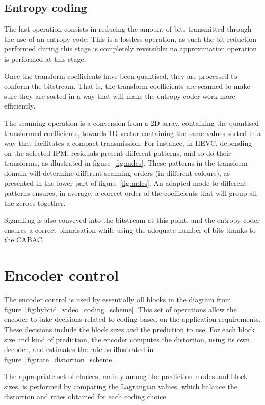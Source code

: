 \documentclass[11pt,a4paper,openright,twoside]{book}
\numberwithin{equation}{section} %
\numberwithin{figure}{section} %
\numberwithin{table}{section} %
\begin{document}
\subsection{Entropy coding}
\label{sub:entropy_coding}

The last operation consists in reducing the amount of bits transmitted through
the use of an entropy code.
This is a lossless operation, as such the bit reduction performed during this
stage is completely reversible: no approximation operation is performed at
this stage.

Once the transform coefficients have been quantised, they are processed to
conform the bitstream.
That is, the transform coefficients are scanned to make sure they are
sorted in a way that will make the entropy coder work more efficiently.

The scanning operation is a conversion from a 2D array, containing the
quantised transformed coefficients, towards 1D vector containing the same
values sorted in a way that facilitates a compact transmission.
For instance, in \ac{HEVC}, depending on the selected \ac{IPM}, residuals
present different patterns, and so do their transforms, as illustrated in
figure~\ref{fig:mdcs}.
These patterns in the transform domain will determine different scanning
orders (in different colours), as presented in the lower part of
figure~\ref{fig:mdcs}.
An adapted mode to different patterns ensures, in average, a correct order of
the coefficients that will group all the zeroes together.

Signalling is also conveyed into the bitstream at this point, and the
entropy coder ensures a correct binarisation while using the adequate
number of bits thanks to the \ac{CABAC}.

\section{Encoder control}
\label{sec:encoder_control}

The encoder control is used by essentially all blocks in the diagram
from figure~\ref{fig:hybrid_video_coding_scheme}.
This set of operations allow the encoder to take decisions related to coding
based on the application requirements.
These decisions include the block sizes and the prediction to use.
For each block size and kind of prediction, the encoder computes the
distortion, using its own decoder, and estimates the rate as illustrated in
figure~\ref{fig:rate_distortion_scheme}.

The appropriate set of choices, mainly among the prediction modes and block
sizes, is performed by comparing the Lagrangian values, which balance the
distortion and rates obtained for each coding choice.
\end{document}
